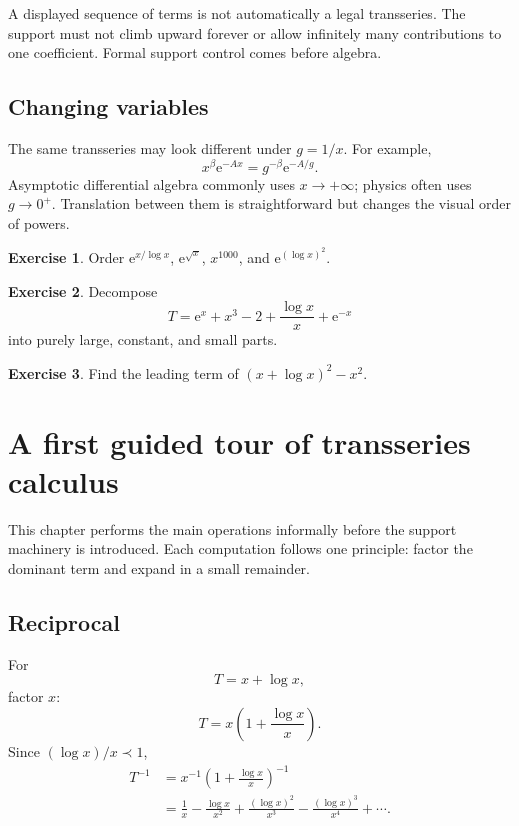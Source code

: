 \documentclass[11pt,oneside,openany]{book}
\newcommand{\e}{\mathrm{e}}
\theoremstyle{plain}
\theoremstyle{definition}
\newtheorem{exercise}{Exercise}[chapter]
\theoremstyle{remark}
\begin{document}
\begin{warningbox}
A displayed sequence of terms is not automatically a legal transseries. The support must not climb upward forever or allow infinitely many contributions to one coefficient. Formal support control comes before algebra.
\end{warningbox}

\section{Changing variables}
The same transseries may look different under $g=1/x$. For example,
\[
  x^\beta\e^{-Ax}
  =g^{-\beta}\e^{-A/g}.
\]
Asymptotic differential algebra commonly uses $x\to+\infty$; physics often uses $g\to0^+$. Translation between them is straightforward but changes the visual order of powers.

\begin{exercise}
Order $\e^{x/\log x}$, $\e^{\sqrt{x}}$, $x^{1000}$, and $\e^{(\log x)^2}$.
\end{exercise}

\begin{exercise}
Decompose
\[
  T=\e^x+x^3-2+\frac{\log x}{x}+\e^{-x}
\]
into purely large, constant, and small parts.
\end{exercise}

\begin{exercise}
Find the leading term of $(x+\log x)^2-x^2$.
\end{exercise}


\chapter{A first guided tour of transseries calculus}
\label{ch:guided-tour}

This chapter performs the main operations informally before the support machinery is introduced. Each computation follows one principle: factor the dominant term and expand in a small remainder.

\section{Reciprocal}
For
\[
  T=x+\log x,
\]
factor $x$:
\[
  T=x\left(1+\frac{\log x}{x}\right).
\]
Since $(\log x)/x\prec1$,
\[
\begin{aligned}
  T^{-1}
  &=x^{-1}\left(1+\frac{\log x}{x}\right)^{-1}\\
  &=\frac1x-\frac{\log x}{x^2}
    +\frac{(\log x)^2}{x^3}
    -\frac{(\log x)^3}{x^4}+\cdots.
\end{aligned}
\]
\end{document}

